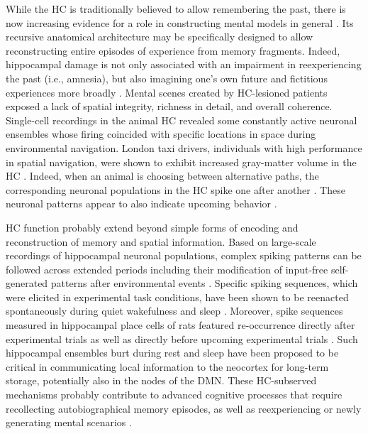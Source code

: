 \documentclass[10pt,letterpaper]{article}
\begin{document}
While the HC
is traditionally believed to allow remembering the past,
there is now increasing evidence for a role
in constructing mental models in general
\citep{maguire2016, schacter2007remembering, gelbard2008internally, Javadi2017}.
Its recursive anatomical architecture
may be specifically designed to allow reconstructing
entire episodes of experience from memory fragments.
Indeed,
hippocampal damage is
not only associated with an impairment in reexperiencing the past (i.e., amnesia),
but also imagining one's own future and
fictitious experiences more broadly \citep{hassabis2007patients}.
Mental scenes created by HC-lesioned patients exposed a lack of
spatial integrity, richness in detail, and overall coherence.
%
Single-cell recordings in the animal HC revealed
some constantly active neuronal ensembles whose firing coincided with
specific locations in space during environmental navigation.
London taxi drivers, individuals with high performance in spatial navigation,
were shown to exhibit increased gray-matter volume in the
HC \citep{maguire2000navigation}.
Indeed, when an animal is choosing between alternative
paths, the corresponding neuronal populations in the HC
spike one after another  \citep{johnson2007neural}.
These neuronal patterns appear to also indicate upcoming behavior
\citep{pfeiffer2013hippocampal}.


HC function probably extend beyond simple forms of
encoding and reconstruction of memory and spatial information.
Based on large-scale recordings of hippocampal neuronal populations,
complex spiking patterns can be followed across extended periods including
their modification of input-free self-generated patterns
after environmental events \citep{buzsaki2004large}.
Specific spiking sequences, which were elicited in experimental task conditions,
have been shown to be reenacted spontaneously during
quiet wakefulness and sleep \citep{hartley2014space, o2010play}.
Moreover, spike sequences measured in hippocampal place cells of rats
featured re-occurrence directly after experimental trials
as well as directly before upcoming experimental trials \citep{diba2007forward}.
Such hippocampal ensembles burt during rest and sleep
have been proposed to be critical in communicating local information
to the neocortex for long-term storage, potentially also in the nodes of the DMN.
These HC-subserved mechanisms
probably contribute to advanced cognitive processes that require
recollecting autobiographical memory episodes, as well as
reexperiencing or newly generating mental scenarios
\citep{hassabis2007patients}.
\end{document}
